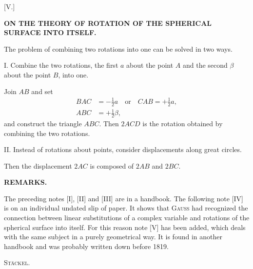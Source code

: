 \clearpage
{}
\begin{center}[V.]\end{center}
\begin{center}\bfseries ON THE THEORY OF ROTATION OF THE SPHERICAL SURFACE INTO ITSELF.\end{center}

The problem of combining two rotations into one can be solved in two ways.

I. Combine the two rotations, the first $a$ about the point $A$ and the second $\beta$ about the point $B$, into one.

\begin{center}
\begin{minipage}{4.4cm}\end{minipage}\hfill
\begin{minipage}{8.1cm}\raggedright
Join $AB$ and set
\[
\begin{aligned}
BAC&=-\tfrac12a\quad\text{or}\quad CAB=+\tfrac12a,\\
ABC&=+\tfrac12\beta,
\end{aligned}
\]
and construct the triangle $ABC$. Then $2ACD$ is the rotation obtained by combining the two rotations.
\end{minipage}
\end{center}

\begin{center}\end{center}
II. Instead of rotations about points, consider displacements along great circles.

Then the displacement $2AC$ is composed of $2AB$ and $2BC$.

\begin{center}\bfseries REMARKS.\end{center}

The preceding notes [I], [II] and [III] are in a handbook. The following note [IV] is on an individual undated slip of paper. It shows that \textsc{Gauss} had recognized the connection between linear substitutions of a complex variable and rotations of the spherical surface into itself. For this reason note [V] has been added, which deals with the same subject in a purely geometrical way. It is found in another handbook and was probably written down before 1819.
\begin{flushright}\textsc{Stäckel.}\end{flushright}
